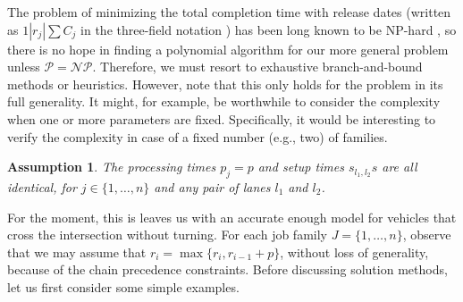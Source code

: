 \documentclass{article}
\theoremstyle{definition}
\theoremstyle{plain}
\newtheorem{assump}{Assumption}[section]
\begin{document}
The problem of minimizing the total completion time with release dates (written
as $1 | r_{j} | \sum C_{j}$ in the three-field notation
\cite{grahamOptimizationApproximationDeterministic1979}) has been long known to
be NP-hard \cite{lenstraComplexityMachineScheduling1977}, so there is no hope in
finding a polynomial algorithm for our more general problem unless
$\mathcal{P} = \mathcal{NP}$. Therefore, we must resort to exhaustive
branch-and-bound methods or heuristics. However, note that this only holds for
the problem in its full generality. It might, for example, be worthwhile to
consider the complexity when one or more parameters are fixed. Specifically, it
would be interesting to verify the complexity in case of a fixed number (e.g.,
two) of families.

\begin{assump}
  \label{assump1}
  The processing times $p_{j} = p$ and setup times $s_{l_{1},l_{2}}s$ are all
  identical, for $j \in \{1, \dots, n\}$ and any pair of lanes $l_{1}$ and
  $l_{2}$.
\end{assump}
For the moment, this is leaves us with an accurate enough model for vehicles
that cross the intersection without turning. For each job family
$J = \{ 1, \dots, n \}$, observe that we may assume that
$r_{i} = \max\{ r_{i}, r_{i-1} + p \}$, without loss of generality, because of
the chain precedence constraints. Before discussing solution methods, let us
first consider some simple examples.
\end{document}
